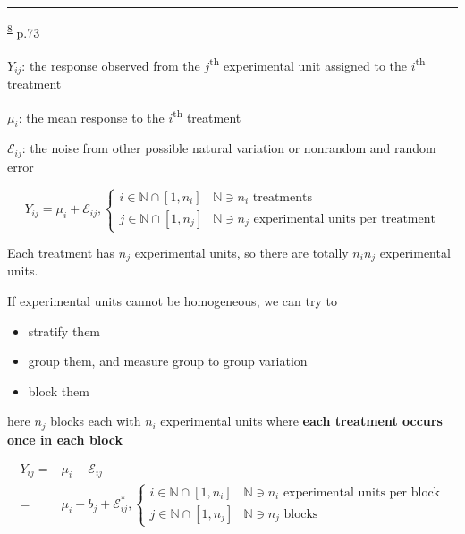 \documentclass[
]{book}
\providecommand{\tightlist}{%
  \setlength{\itemsep}{0pt}\setlength{\parskip}{0pt}}
\theoremstyle{definition}
\theoremstyle{definition}
\theoremstyle{definition}
\theoremstyle{definition}
\theoremstyle{remark}
\begin{document}
\begin{center}\rule{0.5\linewidth}{0.5pt}\end{center}

\textsuperscript{\protect\hyperlink{ref-milliken2004}{8}} p.73

\(Y_{\scriptscriptstyle{ij}}\): the response observed from the \(j\)\textsuperscript{th} experimental unit assigned to the \(i\)\textsuperscript{th} treatment

\(\mu_{\scriptscriptstyle{i}}\): the mean response to the \(i\)\textsuperscript{th} treatment

\(\mathcal{E}_{\scriptscriptstyle{ij}}\): the noise from other possible natural variation or nonrandom and random error

\[
Y_{{\scriptscriptstyle i}{\scriptscriptstyle j}}=\mu_{{\scriptscriptstyle i}}+\mathcal{E}_{{\scriptscriptstyle i}{\scriptscriptstyle j}},\begin{cases}
i\in\mathbb{N}\cap\left[1,n_{{\scriptscriptstyle i}}\right] & \mathbb{N}\ni n_{{\scriptscriptstyle i}}\text{ treatments}\\
j\in\mathbb{N}\cap\left[1,n_{{\scriptscriptstyle j}}\right] & \mathbb{N}\ni n_{{\scriptscriptstyle j}}\text{ experimental units per treatment}
\end{cases}
\]

Each treatment has \(n_{j}\) experimental units, so there are totally \(n_{i}n_{j}\) experimental units.

If experimental units cannot be homogeneous, we can try to

\begin{itemize}
\tightlist
\item
  stratify them
\item
  group them, and measure group to group variation
\item
  block them
\end{itemize}

here \(n_{j}\) blocks each with \(n_{i}\) experimental units where \textbf{each treatment occurs once in each block}

\[
\begin{aligned}
Y_{{\scriptscriptstyle i}{\scriptscriptstyle j}}= & \mu_{{\scriptscriptstyle i}}+\mathcal{E}_{{\scriptscriptstyle i}{\scriptscriptstyle j}}\\
= & \mu_{{\scriptscriptstyle i}}+b_{{\scriptscriptstyle j}}+\mathcal{E}_{{\scriptscriptstyle i}{\scriptscriptstyle j}}^{*},\begin{cases}
i\in\mathbb{N}\cap\left[1,n_{{\scriptscriptstyle i}}\right] & \mathbb{N}\ni n_{{\scriptscriptstyle i}}\text{ experimental units per block}\\
j\in\mathbb{N}\cap\left[1,n_{{\scriptscriptstyle j}}\right] & \mathbb{N}\ni n_{{\scriptscriptstyle j}}\text{ blocks}
\end{cases}
\end{aligned}
\]
\end{document}
